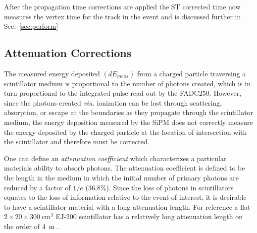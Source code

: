 After the propagation time corrections are applied the ST corrected time now measures the vertex time for the track in the event and is discussed further in Sec.~\ref{sec:perform}

\subsection{Attenuation Corrections} \label{sec:calib_ac}


The measured energy deposited $(dE_{meas})$ from a charged particle traversing a scintillator medium is proportional to the number of photons created, which is in turn proportional to the integrated pulse read out by the FADC250. However, since the photons created \textit{via.} ionization can be lost through scattering, absorption, or escape at the boundaries as they propagate through the scintillator medium, the energy deposition measured by the SiPM does not correctly measure the energy deposited by the charged particle at the location of intersection with the scintillator and therefore must be corrected.  


One can define an \textit{attenuation coefficient} which characterizes a particular materials ability to absorb photons. The attenuation coefficient is defined to be the length in the medium in which the initial number of primary photons are reduced by a factor of $1/e$ (36.8\%).  Since the loss of photons in scintillators equates to the loss of information relative to the event of interest, it is desirable to have a scintillator material with a long attenuation length.  For reference a flat $2 \times 20 \times 300\ \mathrm{cm^{3}}$ EJ-200 scintillator has a relatively long attenuation length on the order of 4~m \cite{ej200_specs}.

